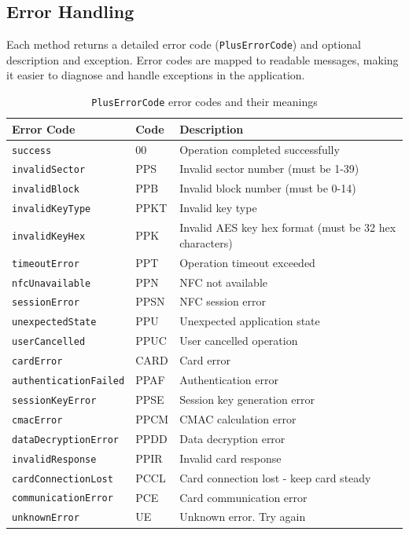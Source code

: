 \documentclass[a4paper,12pt]{article}
\begin{document}
\subsection{Error Handling}
Each method returns a detailed error code (\texttt{PlusErrorCode}) and optional description and exception. Error codes are mapped to readable messages, making it easier to diagnose and handle exceptions in the application.

\begin{table}[h!]
\centering
\begin{tabular}{|l|l|p{6cm}|}
\hline
\textbf{Error Code} & \textbf{Code} & \textbf{Description} \\
\hline
\texttt{success} & 00 & Operation completed successfully \\
\hline
\texttt{invalidSector} & PPS & Invalid sector number (must be 1-39) \\
\hline
\texttt{invalidBlock} & PPB & Invalid block number (must be 0-14) \\
\hline
\texttt{invalidKeyType} & PPKT & Invalid key type \\
\hline
\texttt{invalidKeyHex} & PPK & Invalid AES key hex format (must be 32 hex characters) \\
\hline
\texttt{timeoutError} & PPT & Operation timeout exceeded \\
\hline
\texttt{nfcUnavailable} & PPN & NFC not available \\
\hline
\texttt{sessionError} & PPSN & NFC session error \\
\hline
\texttt{unexpectedState} & PPU & Unexpected application state \\
\hline
\texttt{userCancelled} & PPUC & User cancelled operation \\
\hline
\texttt{cardError} & CARD & Card error \\
\hline
\texttt{authenticationFailed} & PPAF & Authentication error \\
\hline
\texttt{sessionKeyError} & PPSE & Session key generation error \\
\hline
\texttt{cmacError} & PPCM & CMAC calculation error \\
\hline
\texttt{dataDecryptionError} & PPDD & Data decryption error \\
\hline
\texttt{invalidResponse} & PPIR & Invalid card response \\
\hline
\texttt{cardConnectionLost} & PCCL & Card connection lost - keep card steady \\
\hline
\texttt{communicationError} & PCE & Card communication error \\
\hline
\texttt{unknownError} & UE & Unknown error. Try again \\
\hline
\end{tabular}
\caption{\texttt{PlusErrorCode} error codes and their meanings}
\end{table}
\end{document}
